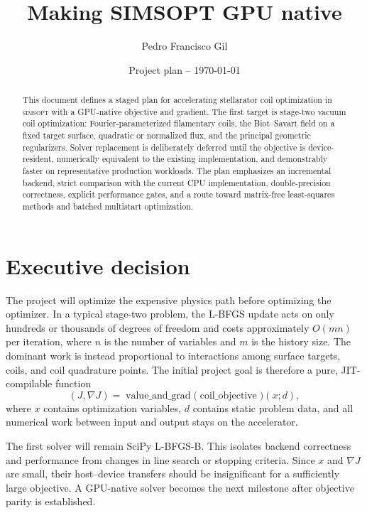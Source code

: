 \documentclass[11pt,a4paper]{article}
\title{Making SIMSOPT GPU native}
\author{Pedro Francisco Gil}
\date{Project plan -- \today}
\newcommand{\simsopt}{\textsc{simsopt}}
\begin{document}
\maketitle

\begin{abstract}
This document defines a staged plan for accelerating stellarator coil
optimization in \simsopt{} with a GPU-native objective and gradient.  The first
target is stage-two vacuum coil optimization: Fourier-parameterized filamentary
coils, the Biot--Savart field on a fixed target surface, quadratic or normalized
flux, and the principal geometric regularizers.  Solver replacement is
deliberately deferred until the objective is device-resident, numerically
equivalent to the existing implementation, and demonstrably faster on
representative production workloads.  The plan emphasizes an incremental
backend, strict comparison with the current CPU implementation, double-precision
correctness, explicit performance gates, and a route toward matrix-free
least-squares methods and batched multistart optimization.
\end{abstract}

\tableofcontents

\section{Executive decision}

The project will optimize the expensive physics path before optimizing the
optimizer.  In a typical stage-two problem, the L-BFGS update acts on only
hundreds or thousands of degrees of freedom and costs approximately
$O(mn)$ per iteration, where $n$ is the number of variables and $m$ is the
history size.  The dominant work is instead proportional to interactions among
surface targets, coils, and coil quadrature points.  The initial project goal is
therefore a pure, JIT-compilable function
\[
  (J, \nabla J) = \operatorname{value\_and\_grad}
  \bigl(\operatorname{coil\_objective}\bigr)(x;d),
\]
where $x$ contains optimization variables, $d$ contains static problem data,
and all numerical work between input and output stays on the accelerator.

The first solver will remain SciPy L-BFGS-B.  This isolates backend correctness
and performance from changes in line search or stopping criteria.  Since $x$
and $\nabla J$ are small, their host--device transfers should be insignificant
for a sufficiently large objective.  A GPU-native solver becomes the next
milestone after objective parity is established.
\end{document}
